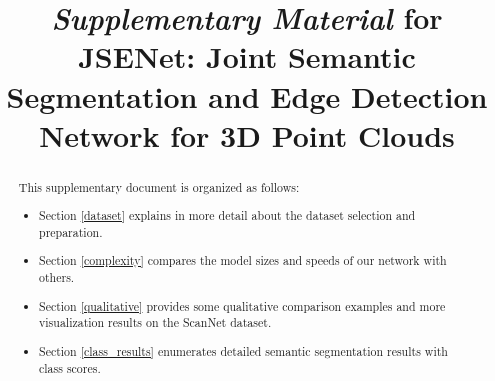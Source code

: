 \documentclass[runningheads]{llncs}
\begin{document}
\clearpage

\renewcommand\thesection{\Alph{section}}






\pagestyle{headings}
\mainmatter
\def\ECCVSubNumber{3411}  

\title{\emph{Supplementary Material} for \\
JSENet: Joint Semantic Segmentation and Edge Detection Network for 3D Point Clouds} 

\author{}
\institute{}


\begin{comment}
\titlerunning{Abbreviated paper title}
\author{First Author\inst{1}\orcidID{0000-1111-2222-3333} \and
Second Author\inst{2,3}\orcidID{1111-2222-3333-4444} \and
Third Author\inst{3}\orcidID{2222--3333-4444-5555}}
\authorrunning{F. Author et al.}
\institute{Princeton University, Princeton NJ 08544, USA \and
Springer Heidelberg, Tiergartenstr. 17, 69121 Heidelberg, Germany
\email{lncs@springer.com}\\
\url{http://www.springer.com/gp/computer-science/lncs} \and
ABC Institute, Rupert-Karls-University Heidelberg, Heidelberg, Germany\\
\email{\{abc,lncs\}@uni-heidelberg.de}}
\end{comment}
\maketitle

\begin{abstract}
This supplementary document is organized as follows:

\begin{itemize}
  \item Section \ref{dataset} explains in more detail about the dataset selection and preparation.
  \item Section \ref{complexity} compares the model sizes and speeds of our network with others.
  \item Section \ref{qualitative} provides some qualitative comparison examples and more visualization results on the ScanNet \cite{dai2017scannet} dataset.
  \item Section \ref{class_results} enumerates detailed semantic segmentation results with class scores.
\end{itemize}
\end{abstract}
\end{document}
